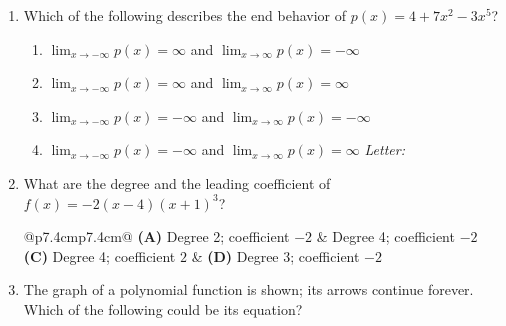 \documentclass[10pt]{article}
\begin{document}
\begin{enumerate}[leftmargin=1.9em, itemsep=10pt]

\item Which of the following describes the end behavior of $p(x) = 4 + 7x^2 - 3x^5$?
      \begin{enumerate}[leftmargin=2.6em, itemsep=1pt]
        \item[{\color{keyred}$\checkmark$\,(A)}] $\lim_{x \to -\infty} p(x) = \infty$ and $\lim_{x \to \infty} p(x) = -\infty$
        \item[(B)] $\lim_{x \to -\infty} p(x) = \infty$ and $\lim_{x \to \infty} p(x) = \infty$
        \item[(C)] $\lim_{x \to -\infty} p(x) = -\infty$ and $\lim_{x \to \infty} p(x) = -\infty$
        \item[(D)] $\lim_{x \to -\infty} p(x) = -\infty$ and $\lim_{x \to \infty} p(x) = \infty$
        \hfill\textit{Letter:}~\gradedblank[id=ap1, type=choice, points=1, answer=A]{0.42in}{13pt}
      \end{enumerate}

\item What are the degree and the leading coefficient of $f(x) = -2(x - 4)(x + 1)^3$?

      \smallskip
      \begin{tabular}{@{}p{7.4cm}p{7.4cm}@{}}
      \textbf{(A)} Degree 2; coefficient $-2$ &  Degree 4; coefficient $-2$ \\[2pt]
      \textbf{(C)} Degree 4; coefficient $2$ & \textbf{(D)} Degree 3; coefficient $-2$
      \hfill{}
      \end{tabular}

\item \begin{minipage}[t]{0.56\linewidth}
      The graph of a polynomial function is shown; its arrows continue forever. Which of the
      following could be its equation?


\end{minipage}
\end{enumerate}
\end{document}
